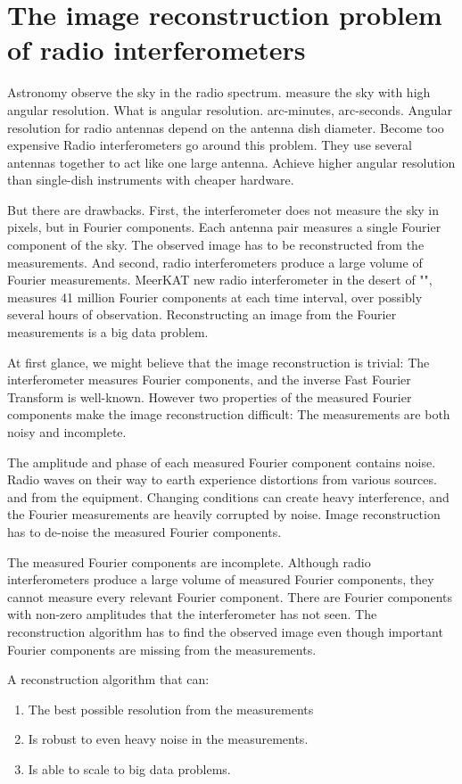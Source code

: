 \section{The image reconstruction problem of radio interferometers}
Astronomy observe the sky in the radio spectrum.
measure the sky with high angular resolution.
What is angular resolution. arc-minutes, arc-seconds.
Angular resolution for radio antennas depend on the antenna dish diameter. Become too expensive
Radio interferometers go around this problem. They use several antennas together to act like one large antenna. Achieve higher angular resolution than single-dish instruments with cheaper hardware.

But there are drawbacks. First, the interferometer does not measure the sky in pixels, but in Fourier components. Each antenna pair measures a single Fourier component of the sky. The observed image has to be reconstructed from the measurements. And second, radio interferometers produce a large volume of Fourier measurements. 
MeerKAT new radio interferometer in the desert of "", measures 41 million Fourier components at each time interval, over possibly several hours of observation.
Reconstructing an image from the Fourier measurements is a big data problem.

At first glance, we might believe that the image reconstruction is trivial: The interferometer measures Fourier components, and the inverse Fast Fourier Transform is well-known. However two properties of the measured Fourier components make the image reconstruction difficult: The measurements are both noisy and incomplete.

The amplitude and phase of each measured Fourier component contains noise.
Radio waves on their way to earth experience distortions from various sources. and from the equipment. Changing conditions can create heavy interference, and the Fourier measurements are heavily corrupted by noise. Image reconstruction has to de-noise the measured Fourier components.

The measured Fourier components are incomplete. Although radio interferometers produce a large volume of measured Fourier components, they cannot measure every relevant Fourier component. There are Fourier components with non-zero amplitudes that the interferometer has not seen. The reconstruction algorithm has to find the observed image even though important Fourier components are missing from the measurements.

A reconstruction algorithm that can:
\begin{enumerate}
	\item The best possible resolution from the measurements
	\item Is robust to even heavy noise in the measurements.
	\item Is able to scale to big data problems.
\end{enumerate}


